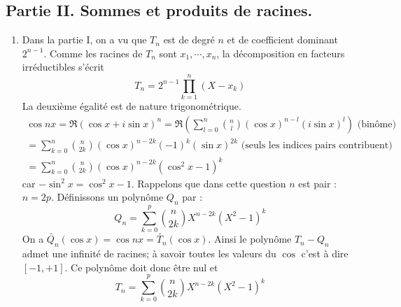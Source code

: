 \subsection*{Partie II. Sommes et produits de racines.}
\begin{enumerate}
 \item Dans la partie I, on a vu que $T_n$ est de degré $n$ et de coefficient dominant $2^{n-1}$. Comme les racines de $T_n$ sont $x_1,\cdots,x_n$, la décomposition en facteurs irréductibles s'écrit
\begin{displaymath}
 T_n = 2^{n-1}\prod_{k=1}^{n}(X-x_k)
\end{displaymath}
La deuxième égalité est de nature trigonométrique.
\begin{multline*}
 \cos nx = \Re (\cos x + i \sin x)^n
= \Re \left( \sum _{l=0}^{n}\binom{n}{l}(\cos x)^{n-l}(i\sin x)^l\right)\text{ (binôme)}\\
= \sum _{k=0}^{n}\binom{n}{2k}(\cos x)^{n-2k}(-1)^k(\sin x)^{2k}\text{ (seuls les indices pairs contribuent)}\\
= \sum _{k=0}^{n}\binom{n}{2k}(\cos x)^{n-2k}(\cos^2 x-1)^{k}
\end{multline*}
car $-\sin^2 x=\cos^2x -1$.\newline
Rappelons que dans cette question $n$ est pair : $n=2p$.\newline
Définissons un polynôme $Q_n$ par :
\begin{displaymath}
 Q_n = \sum _{k=0}^{p}\binom{n}{2k}X^{n-2k}(X^2 -1)^{k}
\end{displaymath}
On a $\widetilde{Q_n}(\cos x)=\cos nx=\widetilde{T_n}(\cos x)$. Ainsi le polynôme $T_n -Q_n$ admet une infinité de racines; à savoir toutes les valeurs du $\cos$ c'est à dire $[-1,+1]$. Ce polynôme doit donc être nul et
\begin{displaymath}
 T_n = \sum _{k=0}^{p}\binom{n}{2k}X^{n-2k}(X^2 -1)^{k}
\end{displaymath}


\end{enumerate}
